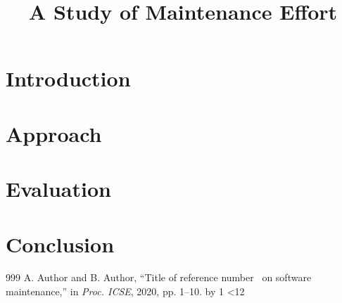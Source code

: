\documentclass[conference,letterpaper]{IEEEtran}
\begin{document}
\title{A Study of Maintenance Effort}
\author{}
\maketitle
\begin{abstract}
\lipsum[1]
\end{abstract}
\section{Introduction}
\lipsum[2-20]
\section{Approach}
\lipsum[21-50]
\section{Evaluation}
\lipsum[51-80]
\section{Conclusion}
\lipsum[81-118]
\begin{thebibliography}{999}
\newcount\n {}
\loop {} A. Author and B. Author, ``Title of reference number \the\n\ on software maintenance,'' in \emph{Proc. ICSE}, 2020, pp. 1--10.
\advance\n by 1 \ifnum\n<12 \repeat
\end{thebibliography}
\end{document}
